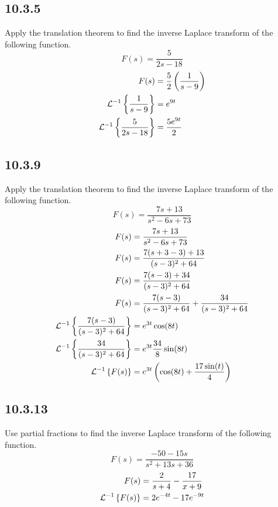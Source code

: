 \documentclass{article}
\begin{document}
\subsection{10.3.5}

Apply the translation theorem to find the inverse Laplace transform of the following function.
\begin{equation*}
	F(s) = \frac{5}{2s - 18}
\end{equation*}
\begin{align*}
	F(s) & = \frac{5}{2} \left( \frac{1}{s - 9} \right) \\
	\ilap[ \frac{1}{s - 9} ] & = e^{9t} \\
	\ilap[ \frac{5}{2s - 18} ] & = \frac{5e^{9t}}{2}
\end{align*}

\subsection{10.3.9}

Apply the translation theorem to find the inverse Laplace transform of the following function.
\begin{equation*}
	F(s) = \frac{7s + 13}{s^2 - 6s + 73}
\end{equation*}
\begin{align*}
	F(s) & = \frac{7s + 13}{s^2 - 6s + 73} \\
	F(s) & = \frac{7(s + 3 - 3) + 13}{(s - 3)^2 + 64} \\
	F(s) & = \frac{7(s - 3) + 34}{(s - 3)^2 + 64} \\
	F(s) & = \frac{7(s - 3)}{(s - 3)^2 + 64} + \frac{34}{(s - 3)^2 + 64} \\
	\ilap[\frac{7(s - 3)}{(s - 3)^2 + 64}] & = e^{3t}\cos(8t) \\
	\ilap[\frac{34}{(s - 3)^2 + 64}] & = e^{3t}\frac{34}{8}\sin(8t) \\
	\ilap[F(s)] & = e^{3t} \left( \cos(8t) + \frac{17\sin(t)}{4} \right)
\end{align*}

\subsection{10.3.13}

Use partial fractions to find the inverse Laplace transform of the following function.
\begin{equation*}
	F(s) = \frac{-50 - 15s}{s^2 + 13s + 36}
\end{equation*}
\begin{align*}
	F(s) & = \frac{2}{s + 4} - \frac{17}{x + 9} \\
	\ilap[F(s)] & = 2e^{-4t} - 17e^{-9t}
\end{align*}
\end{document}
